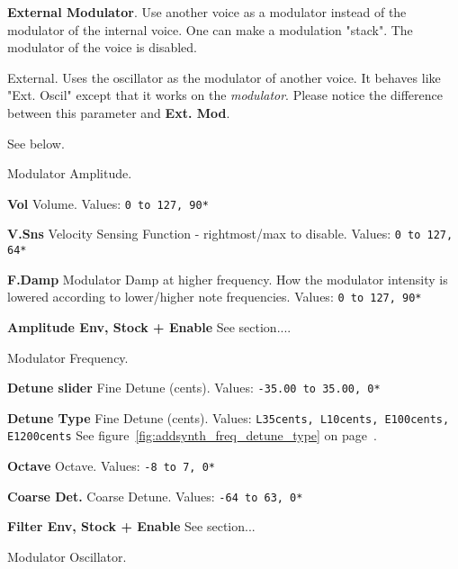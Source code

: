    \textbf{External Modulator}.
   Use another voice as a modulator instead of the modulator of the internal
   voice. One can make a modulation "stack". The modulator of the voice is
   disabled. 

   External. Uses the oscillator as the modulator of another voice. It
   behaves like "Ext. Oscil" except that it works on the
   \textsl{modulator}. Please
   notice the difference between this parameter and \textbf{Ext. Mod}. 

   See below.

   Modulator Amplitude.

   \begin{enumber}
      \item \textbf{Vol}
         Volume.
         Values: \texttt{0 to 127, 90*}
      \item \textbf{V.Sns}
         Velocity Sensing Function - rightmost/max to disable.
         Values: \texttt{0 to 127, 64*}
      \item \textbf{F.Damp}
         Modulator Damp at higher frequency.
         How the modulator intensity is lowered according to lower/higher
         note frequencies. 
         Values: \texttt{0 to 127, 90*}
      \item \textbf{Amplitude Env, Stock + Enable}
         See section....
   \end{enumber}

   Modulator Frequency.

   \begin{enumber}
      \item \textbf{Detune slider}
         Fine Detune (cents).
         Values: \texttt{-35.00 to 35.00, 0*}
      \item \textbf{Detune Type}
         Fine Detune (cents).
         Values: \texttt{L35cents, L10cents, E100cents, E1200cents}
         See figure~\ref{fig:addsynth_freq_detune_type} on
         page~\pageref{fig:addsynth_freq_detune_type}.
      \item \textbf{Octave}
         Octave.
         Values: \texttt{-8 to 7, 0*}
      \item \textbf{Coarse Det.}
         Coarse Detune.
         Values: \texttt{-64 to 63, 0*}
      \item \textbf{Filter Env, Stock + Enable}
         See section...
   \end{enumber}

   Modulator Oscillator.

